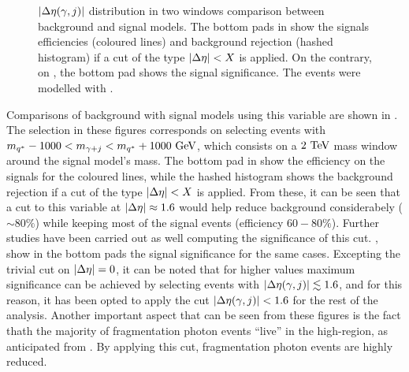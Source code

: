 \begin{figure}[ht!]
\begin{subfigure}[h]{0.49\linewidth}
        \label{fig:evt_selection:sr_opt:eta:deta:1d:SB_6000W}
    \end{subfigure}
    \caption{\(|\Delta\eta(\gamma, j)|\) distribution in two \myj windows comparison between background and signal models. The bottom pads in \Figs{\ref{fig:evt_selection:sr_opt:eta:deta:1d:effrej_2000W}}{\ref{fig:evt_selection:sr_opt:eta:deta:1d:effrej_6000W}} show the signals efficiencies (coloured lines) and background rejection (hashed histogram) if a cut of the type \(|\Delta\eta| < X\) is applied. On the contrary, on \Figs{\ref{fig:evt_selection:sr_opt:eta:deta:1d:SB_2000W}}{\ref{fig:evt_selection:sr_opt:eta:deta:1d:SB_6000W}}, the bottom pad shows the signal significance. The \yj events were modelled with \pythia.}
    \label{fig:evt_selection:sr_opt:eta:deta:1d}
\end{figure}

Comparisons of background with signal models using this variable are shown in \Fig{\ref{fig:evt_selection:sr_opt:eta:deta:1d}}. The selection in these figures corresponds on selecting events with \(m_{q^*} - 1000 < m_{\gamma+j} < m_{q^*} + 1000 ~\text{GeV}\), which consists on a \(2~\text{TeV}\) mass window around the signal model's mass.
The bottom pad in \Figs{\ref{fig:evt_selection:sr_opt:eta:deta:1d:effrej_2000W}}{\ref{fig:evt_selection:sr_opt:eta:deta:1d:effrej_6000W}} show the efficiency on the signals for the coloured lines, while the hashed histogram shows the background rejection if a cut of the type \(|\Delta\eta| < X\) is applied. From these, it can be seen that a cut to this variable at \(|\Delta\eta| \approx 1.6\) would help reduce background considerabely (\(\sim 80\%\)) while keeping most of the signal events (efficiency \(60-80\%\)).
Further studies have been carried out as well computing the significance of this cut. \Figs{\ref{fig:evt_selection:sr_opt:eta:deta:1d:SB_2000W}}{\ref{fig:evt_selection:sr_opt:eta:deta:1d:SB_6000W}}, show in the bottom pads the signal significance for the same cases.
Excepting the trivial cut on \(|\Delta\eta| = 0\), it can be noted that for higher \myj values maximum significance can be achieved by selecting events with \(|\Delta\eta(\gamma, j)| \lesssim 1.6\), and for this reason, it has been opted to apply the cut \(|\Delta\eta(\gamma, j)| < 1.6\) for the rest of the analysis.
Another important aspect that can be seen from these figures is the fact thath the majority of fragmentation photon events \enquote{live} in the high-\Deta region, as anticipated from \Fig{\ref{fig:evt_selection:sr_opt:eta:deta:2d:frag}}. By applying this cut, fragmentation photon events are highly reduced.


